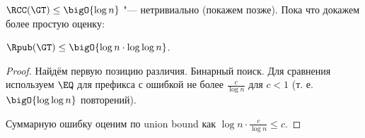 $\RCC(\GT) \le \bigO{\log n}$ "--- нетривиально (покажем позже). Пока что докажем более простую оценку:

\begin{theorem}
\label{R-pub(GT) simple}
$\Rpub(\GT) \le \bigO{\log n\cdot \log\log n}$.
\end{theorem}
\begin{proof}
Найдём первую позицию различия.
Бинарный поиск. Для сравнения используем $\EQ$ для префикса с ошибкой не более $\frac{c}{\log n}$ для $c < 1$ (т. е. $\bigO{\log \log n}$ повторений).

Суммарную ошибку оценим по union bound как $\log n \cdot \frac{c}{\log n} \leq c$.
\end{proof}